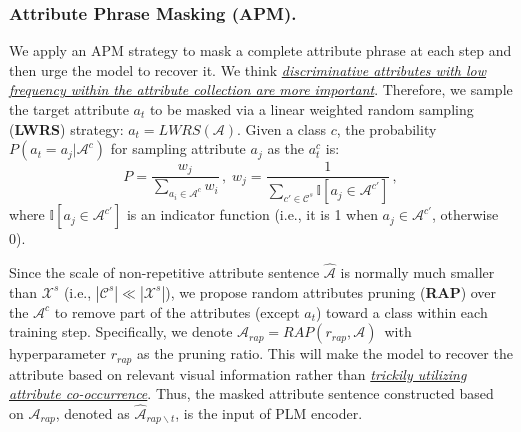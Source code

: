 \documentclass[letterpaper]{article} \usepackage{aaai23}  \usepackage{times}  \usepackage{helvet}  \usepackage{courier}  \usepackage[hyphens]{url}  \usepackage{graphicx} \urlstyle{rm} \def\UrlFont{\rm}  \usepackage{natbib}  \usepackage{caption} \frenchspacing  \setlength{\pdfpagewidth}{8.5in}  \setlength{\pdfpageheight}{11in}  \usepackage{algorithm}
\newcommand{\wen}[1]{{\color{black}#1}}
\newcommand{\fy}[1]{{\color{black}#1}}
\begin{document}
\subsubsection{\textbf{Attribute Phrase Masking (APM).}} 
{We apply }
an
APM strategy to mask a complete attribute phrase at each step \fy{and} then urge the model to recover it.
\wen{We think \ul{\emph{discriminative  attributes with low frequency within the attribute collection are more important}}. Therefore,}
we sample the target attribute $a_t$ to be masked via a linear weighted random sampling (\textbf{LWRS}) strategy:
$a_{t}=LWRS(\mathcal{A})$.
Given \wen{a} class $c$, 
the probability $P(a_t=a_j|\mathcal{A}^c)$ for sampling attribute $a_j$ as the $a_{t}^c$  is:
\begin{equation} \label{eq:lwrs}
P=\frac{w_{j}}{\sum_{a_{i} \in \mathcal{A}^c} w_{i}}\,, \;
w_{j}=\frac{1}{\sum_{{c}\prime \in \mathcal{C}^s} \mathbb{I}{\left[a_j \in \mathcal{A}^{{c}\prime}\right]}} \,,
\end{equation}
where $\mathbb{I}{\left[a_j \in \mathcal{A}^{{c}\prime}\right]}$ is an indicator function (i.e., it is 1 when $a_j \in \mathcal{A}^{{c}\prime}$, otherwise 0). 

Since 
the scale of non-repetitive attribute sentence $\widehat{\mathcal{A}}$ is normally much smaller than  $\mathcal{X}^{s}$ (i.e., $|\mathcal{C}^{s}| \ll |\mathcal{X}^{s}|$), 
 we propose random attributes pruning (\textbf{RAP})  over the $\mathcal{A}^c$ to remove part of the attributes (except $a_{t}$) toward a class within each training step.
Specifically, we denote $\mathcal{A}_{rap} = RAP(r_{rap}, \mathcal{A})\,$ with hyperparameter $r_{rap}$ as the pruning ratio.
\wen{This will make }
the model to recover the attribute based on relevant visual information rather than 
\ul{\emph{trickily utilizing attribute co-occurrence}}.
\wen{Thus, the masked attribute sentence constructed based on $\mathcal{A}_{rap}$, denoted as $\widehat{\mathcal{A}}_{rap\backslash t}$,
is the input of PLM encoder.
}
\end{document}
